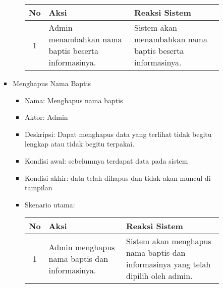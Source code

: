 \documentclass[a4paper,twoside]{article}
\begin{document}
\begin{enumerate}
\begin{enumerate}
\begin{enumerate}
\begin{itemize}
\begin{itemize}
				\begin{center}
			  \begin{tabular}{ | c | p{5cm} |p{5cm} |}
			    \hline
			    No  & Aksi & Reaksi Sistem\\ \hline 
				1 & Admin menambahkan nama baptis beserta informasinya.%
				&  Sistem akan menambahkan nama baptis beserta informasinya.\\ \hline 
			    \end{tabular}
			\end{center} 

                                \end{itemize}
																\item Menghapus Nama Baptis

                                \begin{itemize}
                                        \item Nama: Menghapus nama baptis
                                        \item Aktor: Admin
                                        \item Deskripsi: Dapat menghapus data yang terlihat tidak begitu lengkap atau tidak begitu terpakai.
                                        \item Kondisi awal: sebelumnya terdapat data pada sistem %
                                        \item Kondisi akhir: data telah dihapus dan tidak akan muncul di tampilan%
                                        \item Skenario utama:														
				
				\begin{center}
			  \begin{tabular}{ | c | p{5cm} |p{5cm} |}
			    \hline
			    No  & Aksi & Reaksi Sistem\\ \hline 
				1 & Admin menghapus nama baptis dan informasinya.%
				&  Sistem akan menghapus nama baptis dan informasinya yang telah dipilih oleh admin.\\ \hline 
			    \end{tabular}
			\end{center} 

\end{itemize}

                                 
                                

\end{itemize}
\end{enumerate}
\end{enumerate}
\end{enumerate}
\end{document}
